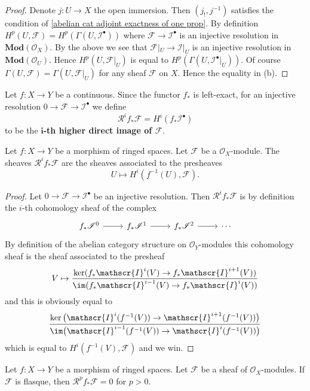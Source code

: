 \begin{proof}
Denote $j:U\to X$ the open immersion. Then $(j_!,j^{-1})$ satisfies the condition of \cref{abelian cat adjoint exactness of one prop}. By definition $H^p(U,\mathscr{F})=H^p(\Gamma(U,\mathscr{I}^\bullet))$ where $\mathscr{F}\to\mathscr{I}^\bullet$ is an injective resolution in $\mathbf{Mod}(\mathcal{O}_X)$. By the above we see that $\mathscr{F}|_U\to\mathscr{I}|_U$ is an injective resolution in $\mathbf{Mod}(\mathcal{O}_U)$. Hence $H^p(U,\mathscr{F}|_U)$ is equal to $H^p(\Gamma(U,\mathscr{I}^\bullet|_U))$. Of course $\Gamma(U,\mathscr{F})=\Gamma(U,\mathscr{F}|_U)$ for any sheaf $\mathscr{F}$ on $X$. Hence the equality in (b).
\end{proof}
Let $f:X\to Y$ be a continuous. Since the functor $f_*$ is left-exact, for an injective resolution $0\to\mathscr{F}\to\mathscr{I}^\bullet$ we define 
\[\mathcal{R}^if_*\mathscr{F}=H^i(f_*\mathscr{I}^\bullet)\]
to be the \textbf{$\bm{i}$-th higher direct image of $\mathscr{F}$}.
\begin{proposition}\label{push derive char}
Let $f:X\to Y$ be a morphism of ringed spaces. Let $\mathscr{F}$ be a $\mathscr{O}_X$-module. The sheaves $\mathcal{R}^if_*\mathscr{F}$ are the sheaves associated to the presheaves
\[U\mapsto H^i(f^{-1}(U),\mathscr{F}).\]
\end{proposition}
\begin{proof}
Let $0\to\mathscr{F}\to\mathscr{I}^\bullet$ be an injective resolution. Then $\mathcal{R}^if_*\mathscr{F}$ is by definition the $i$-th cohomology sheaf of the complex
\[\begin{tikzcd}
f_*\mathscr{I}^0\ar[r]&f_*\mathscr{I}^1\ar[r]&f_*\mathscr{I}^2\ar[r]&\cdots
\end{tikzcd}\]
By definition of the abelian category structure on $\mathscr{O}_Y$-modules this cohomology sheaf is the sheaf associated to the presheaf
\[V\mapsto\frac{\ker(f_*\mathscr{I}^i(V)\to f_*\mathscr{I}^{i+1}(V))}{\im (f_*\mathscr{I}^{i-1}(V)\to f_*\mathscr{I}^{i}(V))}\]
and this is obviously equal to
\[\frac{\ker\big(\mathscr{I}^i(f^{-1}(V))\to\mathscr{I}^{i+1}(f^{-1}(V))\big)}{\im\big(\mathscr{I}^{i-1}(f^{-1}(V))\to\mathscr{I}^{i}(f^{-1}(V))\big)}\]
which is equal to $H^i(f^{-1}(V),\mathscr{F})$ and we win.
\end{proof}
\begin{corollary}
Let $f:X\to Y$ be a morphism of ringed spaces. Let $\mathscr{F}$ be a sheaf of $\mathscr{O}_X$-modules. If $\mathscr{F}$ is flasque, then $\mathcal{R}^pf_*\mathscr{F}=0$ for $p>0$.
\end{corollary}
